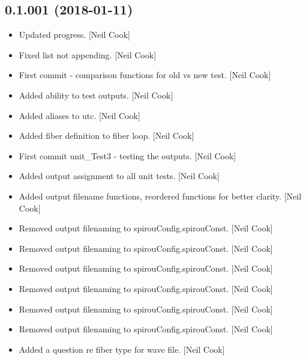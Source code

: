 \documentclass[a4paper,10pt,english]{report}
\begin{document}
\subsection{0.1.001 (2018-01-11)}
\label{\detokenize{misc/changelog:id501}}\begin{itemize}
\item {} 
Updated progress. {[}Neil Cook{]}

\item {} 
Fixed list not appending. {[}Neil Cook{]}

\item {} 
First commit - comparison functions for old vs new test. {[}Neil Cook{]}

\item {} 
Added ability to test outputs. {[}Neil Cook{]}

\item {} 
Added aliases to utc. {[}Neil Cook{]}

\item {} 
Added fiber definition to fiber loop. {[}Neil Cook{]}

\item {} 
First commit unit\_Test3 - testing the outputs. {[}Neil Cook{]}

\item {} 
Added output assignment to all unit tests. {[}Neil Cook{]}

\item {} 
Added output filename functions, reordered functions for better
clarity. {[}Neil Cook{]}

\item {} 
Removed output filenaming to spirouConfig.spirouConst. {[}Neil Cook{]}

\item {} 
Removed output filenaming to spirouConfig.spirouConst. {[}Neil Cook{]}

\item {} 
Removed output filenaming to spirouConfig.spirouConst. {[}Neil Cook{]}

\item {} 
Removed output filenaming to spirouConfig.spirouConst. {[}Neil Cook{]}

\item {} 
Removed output filenaming to spirouConfig.spirouConst. {[}Neil Cook{]}

\item {} 
Removed output filenaming to spirouConfig.spirouConst. {[}Neil Cook{]}

\item {} 
Added a question re fiber type for wave file. {[}Neil Cook{]}


\end{itemize}
\end{document}
